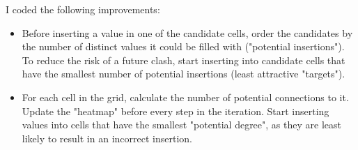 I coded the following improvements:
\begin{itemize}
\item Before inserting a value in one of the candidate cells, order the candidates by the number of distinct values it could be filled with ("potential insertions"). To reduce the risk of a future clash, start inserting into candidate cells that have the smallest number of potential insertions (least attractive "targets").
\item For each cell in the grid, calculate the number of potential connections to it. Update the "heatmap" before every step in the iteration. Start inserting values into cells that have the smallest "potential degree", as they are least likely to result in an incorrect insertion.
\end{itemize}


